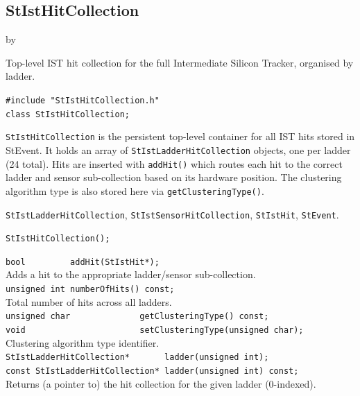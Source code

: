 \documentclass[twoside]{article}
\newcommand{\StEvent}{\textsf{StEvent}}
\newcommand{\entrylabel}[1]{\mbox{\textbf{{#1}}}\hfil}%
\newenvironment{entry}
{\begin{list}{}%
    {\renewcommand{\makelabel}{\entrylabel}%
     \setlength{\labelwidth}{90pt}%
     \setlength{\leftmargin}{\labelwidth}
     \advance\leftmargin by \labelsep%
      }%
    }%
  {\end{list}}
\newcommand{\Entrylabel}[1]%
{\raisebox{0pt}[1ex][0pt]{\makebox[\labelwidth][l]%
    {\parbox[t]{\labelwidth}{\hspace{0pt}\textbf{{#1}}}}}}
\newenvironment{Entry}%
{\renewcommand{\entrylabel}{\Entrylabel}\begin{entry}}%
  {\end{entry}}
\begin{document}
\subsection{StIstHitCollection}
\label{sec:StIstHitCollection}
\begin{Entry}
\item[Summary] Top-level IST hit collection for the full Intermediate Silicon
    Tracker, organised by ladder.
\item[Synopsis]
    \verb+#include "StIstHitCollection.h"+\\
    \verb+class StIstHitCollection;+\\
\item[Description]
    \texttt{StIstHitCollection} is the persistent top-level container for all
    IST hits stored in \StEvent.  It holds an array of
    \texttt{StIstLadderHitCollection} objects, one per ladder (24 total).
    Hits are inserted with \verb+addHit()+ which routes each hit to the
    correct ladder and sensor sub-collection based on its hardware position.
    The clustering algorithm type is also stored here via
    \verb+getClusteringType()+.
\item[Related Classes]
    \texttt{StIstLadderHitCollection}, \texttt{StIstSensorHitCollection},
    \texttt{StIstHit}, \texttt{StEvent}.
\item[Public\\ Constructors]
    \verb+StIstHitCollection();+\\
\item[Public Member\\ Functions]
    \verb+bool         addHit(StIstHit*);+\\
    Adds a hit to the appropriate ladder/sensor sub-collection.\\
    \verb+unsigned int numberOfHits() const;+\\
    Total number of hits across all ladders.\\
    \verb+unsigned char              getClusteringType() const;+\\
    \verb+void                       setClusteringType(unsigned char);+\\
    Clustering algorithm type identifier.\\
    \verb+StIstLadderHitCollection*       ladder(unsigned int);+\\
    \verb+const StIstLadderHitCollection* ladder(unsigned int) const;+\\
    Returns (a pointer to) the hit collection for the given ladder (0-indexed).\\
\end{Entry}
\clearpage
\end{document}

